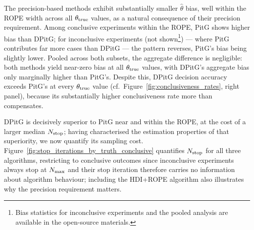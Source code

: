 The precision-based methods exhibit substantially smaller $\hat{\theta}$ bias, well
within the ROPE width across all $\theta_{\rm true}$ values, as a natural consequence
of their precision requirement. Among conclusive experiments within the ROPE, PitG
shows higher bias than DPitG; for inconclusive experiments (not shown\footnote{Bias
statistics for inconclusive experiments and the pooled analysis are available in the
open-source materials.}) --- where PitG contributes far more cases than DPitG ---
the pattern reverses, PitG's bias being slightly lower.
Pooled across both subsets, the aggregate difference is negligible: both methods yield
near-zero bias at all $\theta_{\rm true}$ values, with DPitG's aggregate bias only
marginally higher than PitG's.
Despite this, DPitG decision accuracy exceeds PitG's at every $\theta_{\rm true}$ value
(cf.\ Figure~\ref{fig:conclusiveness_rates}, right panel), because its substantially
higher conclusiveness rate more than compensates.

DPitG is decisively superior to PitG near and within the ROPE, at the cost of a larger
median $N_{\rm stop}$; having characterised the estimation properties of that superiority,
we now quantify its sampling cost.
Figure~\ref{fig:stop_iterations_by_truth_conclusive} quantifies $N_{\rm stop}$ for all three
algorithms, restricting to conclusive outcomes since inconclusive experiments always stop
at $N_{\rm max}$ and their stop iteration therefore carries no information about
algorithm behaviour; including the HDI+ROPE algorithm also illustrates why the precision
requirement matters.

